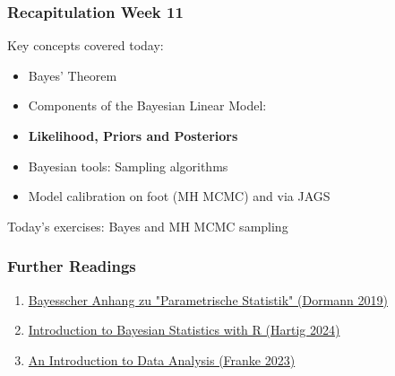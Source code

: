 \documentclass{beamer}
\begin{document}
\begin{frame}
\frametitle{Recapitulation Week 11}
    Key concepts covered today:
    \begin{itemize}
        \item Bayes' Theorem
        \item Components of the Bayesian Linear Model:
        \item[] \textbf{Likelihood, Priors and Posteriors}
        \item Bayesian tools: Sampling algorithms
        \item Model calibration on foot (MH MCMC) and via JAGS
    \end{itemize}
    \vspace{0.2cm}

    Today's exercises: Bayes and MH MCMC sampling
\end{frame}

\begin{frame}
    \frametitle{Further Readings}
    \Large
    \begin{enumerate}
        \item \href{https://www.biom.uni-freiburg.de/mitarbeiter/dormann/stats-gna.pdf}{Bayesscher Anhang zu "Parametrische Statistik" (Dormann 2019)}
        \item \href{https://florianhartig.github.io/LearningBayes/}{Introduction to Bayesian Statistics with R (Hartig 2024)}
        \item \href{https://michael-franke.github.io/intro-data-analysis/}{An Introduction to Data Analysis (Franke 2023)}
    \end{enumerate}

\end{frame}



    
\end{document}
